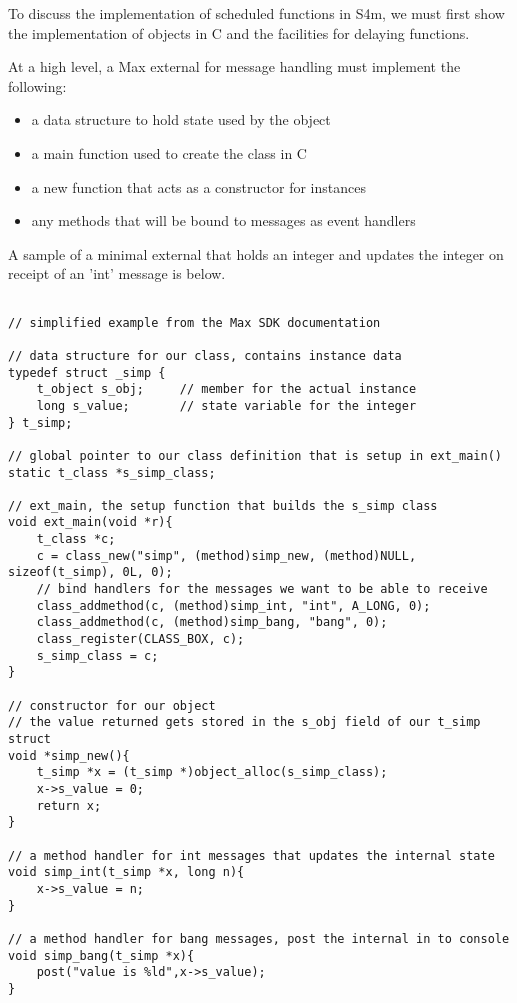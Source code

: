 \documentclass[acmsmall]{acmart}
\begin{document}
To discuss the implementation of scheduled functions in S4m, we must first show
the implementation of objects in C and the facilities for delaying functions.

At a high level, a Max external for message handling must implement the following:
\begin{itemize}
\item a data structure to hold state used by the object
\item a main function used to create the class in C
\item a new function that acts as a constructor for instances
\item any methods that will be bound to messages as event handlers
\end{itemize}

A sample of a minimal external that holds an integer and updates the integer
on receipt of an 'int' message is below.

\begin{verbatim}

// simplified example from the Max SDK documentation

// data structure for our class, contains instance data
typedef struct _simp {
    t_object s_obj;     // member for the actual instance 
    long s_value;       // state variable for the integer
} t_simp;

// global pointer to our class definition that is setup in ext_main()
static t_class *s_simp_class; 

// ext_main, the setup function that builds the s_simp class
void ext_main(void *r){
    t_class *c;
    c = class_new("simp", (method)simp_new, (method)NULL, sizeof(t_simp), 0L, 0);
    // bind handlers for the messages we want to be able to receive
    class_addmethod(c, (method)simp_int, "int", A_LONG, 0);
    class_addmethod(c, (method)simp_bang, "bang", 0);
    class_register(CLASS_BOX, c);
    s_simp_class = c;
}

// constructor for our object
// the value returned gets stored in the s_obj field of our t_simp struct
void *simp_new(){
    t_simp *x = (t_simp *)object_alloc(s_simp_class);
    x->s_value = 0;
    return x;
}

// a method handler for int messages that updates the internal state
void simp_int(t_simp *x, long n){
    x->s_value = n;
}

// a method handler for bang messages, post the internal in to console
void simp_bang(t_simp *x){
    post("value is %ld",x->s_value);
}

\end{verbatim}
\end{document}
